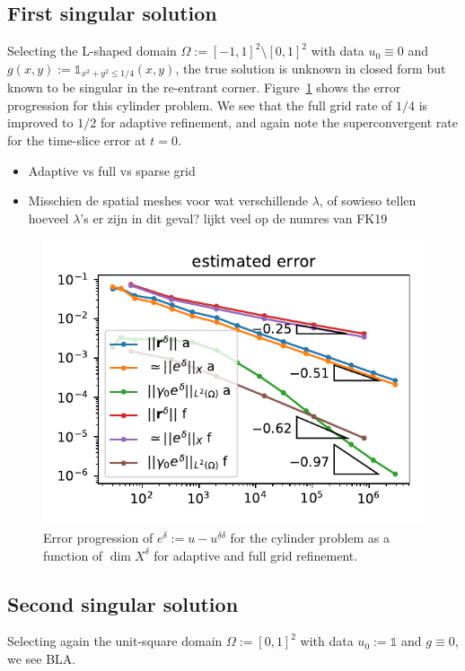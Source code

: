 \documentclass[11pt,a4paper,oneside,english]{amsart}
\numberwithin{equation}{section}
\numberwithin{theorem}{section}
\theoremstyle{definition}
\newcommand{\jw}[1]{{\color{red}{JW: #1}}}
\newcommand{\bbone}{\mathds{1}}
\begin{document}
\subsection{First singular solution}
Selecting the L-shaped domain $\Omega := [-1,1]^2 \setminus [0,1]^2$ with data
$u_0 \equiv 0$ and $g(x,y) := \bbone_{{x^2 + y^2 \leq 1/4}}(x,y)$, the true
solution is unknown in closed form but known to be singular in the re-entrant
corner.\jw{is het wel singulier? of alleen minder regulier? hier wil ik een citatie of *iets* anders}
Figure~\ref{fig:cylinder} shows the error progression for this cylinder problem.
We see that the full grid rate of $1/4$ is improved to $1/2$ for adaptive refinement,
and again note the superconvergent rate for the time-slice error at $t=0$.
\begin{itemize}
  \item Adaptive vs full vs sparse grid
  \item Misschien de spatial meshes voor wat verschillende $\lambda$, of sowieso
    tellen hoeveel $\lambda$'s er zijn in dit geval? lijkt veel op de numres van FK19
\end{itemize}
\begin{figure}
  \includegraphics[width=0.5\linewidth]{cylinder_adaptive_errors}
  \caption{Error progression of $e^\delta := u - u^{\underline{\delta}\delta}$ for the cylinder problem as
  a function of $\dim X^\delta$ for adaptive and full grid refinement.\jw{excuse the terrible graph}}
  \label{fig:cylinder}
\end{figure}

\subsection{Second singular solution}
Selecting again the unit-square domain $\Omega := [0,1]^2$ with data $u_0 := \bbone$
and $g \equiv 0$, we see BLA.
\end{document}
